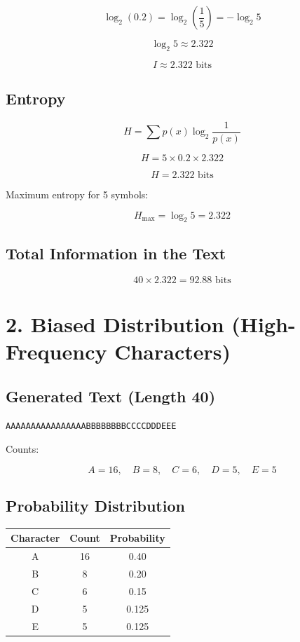 \documentclass[12pt,oneside]{report}
\begin{document}
\[
\log_2(0.2) = \log_2\left(\frac{1}{5}\right) = -\log_2 5
\]

\[
\log_2 5 \approx 2.322
\]

\[
I \approx 2.322 \text{ bits}
\]

\subsection*{Entropy}

\[
H = \sum p(x) \log_2 \frac{1}{p(x)}
\]

\[
H = 5 \times 0.2 \times 2.322
\]

\[
H = 2.322 \text{ bits}
\]

Maximum entropy for 5 symbols:

\[
H_{\max} = \log_2 5 = 2.322
\]

\subsection*{Total Information in the Text}

\[
40 \times 2.322 = 92.88 \text{ bits}
\]

\section*{2. Biased Distribution (High-Frequency Characters)}

\subsection*{Generated Text (Length 40)}

\texttt{AAAAAAAAAAAAAAAABBBBBBBBCCCCDDDEEE}

Counts:

\[
A = 16,\quad B = 8,\quad C = 6,\quad D = 5,\quad E = 5
\]

\subsection*{Probability Distribution}

\begin{center}
\begin{tabular}{ccc}
\toprule
Character & Count & Probability \\
\midrule
A & 16 & 0.40 \\
B & 8 & 0.20 \\
C & 6 & 0.15 \\
D & 5 & 0.125 \\
E & 5 & 0.125 \\
\bottomrule
\end{tabular}
\end{center}
\end{document}
